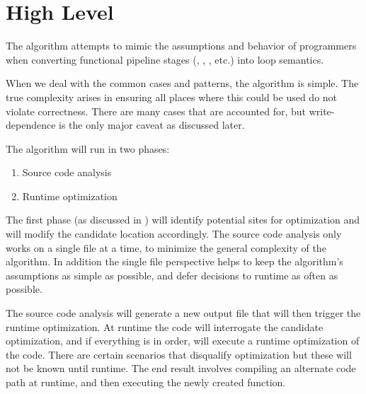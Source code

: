 \section{High Level}
The algorithm attempts to mimic the assumptions and behavior of programmers when converting functional pipeline stages (, , , etc.) into  loop semantics.

When we deal with the common cases and patterns, the algorithm is simple.  The true complexity arises in ensuring all places where this could be used do not violate correctness. There are many cases that are accounted for, but write-dependence is the only major caveat as discussed later.

The algorithm will run in two phases:
  \begin{enumerate}
    \item Source code analysis 
    \item Runtime optimization 
  \end{enumerate}

The first phase (as discussed in ) will identify potential sites for optimization and will modify the candidate location accordingly.  The source code analysis only works on a single file at a time, to minimize the general complexity of the algorithm. In addition the single file perspective helps to keep the algorithm's assumptions as simple as possible, and defer decisions to runtime as often as possible.

The source code analysis will generate a new output file that will then trigger the runtime optimization.  At runtime the code will interrogate the candidate optimization, and if everything is in order, will execute a runtime optimization of the code. There are certain scenarios that disqualify optimization but these will not be known until runtime.  The end result involves compiling an alternate code path at runtime, and then executing the newly created function.  